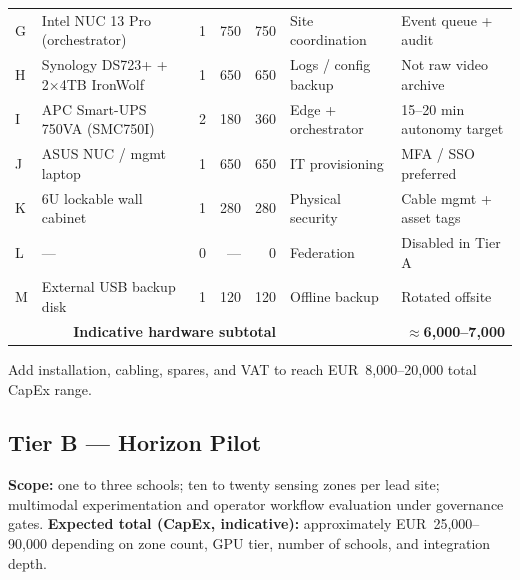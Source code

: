 \begin{longtable}{@{}p{0.7cm}p{2.4cm}p{2.6cm}r r p{2.2cm}p{2.5cm}@{}}
  G & Intel NUC 13 Pro (orchestrator) & 1 & 750 & 750 &
    Site coordination & Event queue + audit \\
  H & Synology DS723+ + 2×4TB IronWolf & 1 & 650 & 650 &
    Logs / config backup & Not raw video archive \\
  I & APC Smart-UPS 750VA (SMC750I) & 2 & 180 & 360 &
    Edge + orchestrator & 15--20 min autonomy target \\
  J & ASUS NUC / mgmt laptop & 1 & 650 & 650 &
    IT provisioning & MFA / SSO preferred \\
  K & 6U lockable wall cabinet & 1 & 280 & 280 &
    Physical security & Cable mgmt + asset tags \\
  L & --- & 0 & --- & 0 &
    Federation & Disabled in Tier A \\
  M & External USB backup disk & 1 & 120 & 120 &
    Offline backup & Rotated offsite \\
  \midrule
  \multicolumn{5}{r}{\textbf{Indicative hardware subtotal}} &
    \multicolumn{2}{r}{\textbf{$\approx$6{,}000--7{,}000}} \\
\end{longtable}

\noindent Add installation, cabling, spares, and VAT to reach EUR~8{,}000--20{,}000 total CapEx range.

\subsection{Tier B --- Horizon Pilot}

\textbf{Scope:} one to three schools; ten to twenty sensing zones per lead site; multimodal
experimentation and operator workflow evaluation under governance gates.
\textbf{Expected total (CapEx, indicative):} approximately EUR~25{,}000--90{,}000 depending on zone
count, GPU tier, number of schools, and integration depth.

